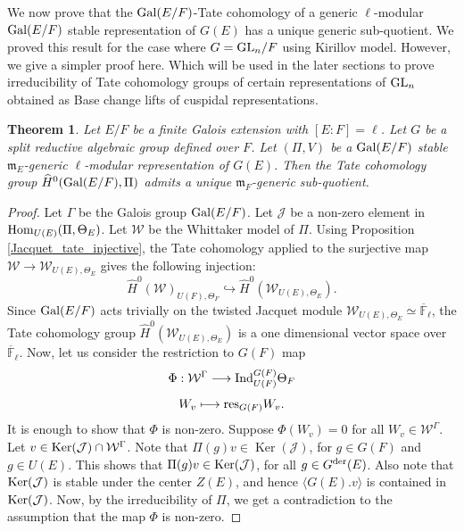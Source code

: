 \documentclass[10pt, reqno]{amsart}
\theoremstyle{plain}
\numberwithin{equation}{section} \newcommand{\di}{\operatorname{dim}}
\newcommand{\Ker}{\operatorname{Ker}}
\newtheorem{theorem}{Theorem}[subsection]
\begin{document}
\subsubsection{}
We now prove that the ${\rm Gal}(E/F)$-Tate cohomology of a generic
$\ell$-modular ${\rm Gal}(E/F)$ stable representation of $G(E)$ has a
unique generic sub-quotient. We proved this result for the case where
$G={\rm GL}_n/F$ using Kirillov model.  However, we give a simpler
proof here. Which will be used in the later sections to prove
irreducibility of Tate cohomology groups of certain representations of
${\rm GL}_n$ obtained as Base change lifts of cuspidal
representations.
\begin{theorem}\label{Tate_generic} 
Let $E/F$ be a finite Galois extension with $[E:F]=\ell$. Let $G$ be
a split reductive algebraic group defined over $F$. Let
$(\Pi,V)$ be a ${\rm Gal}(E/F)$ stable $\mathfrak{m}_E$-generic
$\ell$-modular representation of $G(E)$.  Then the Tate cohomology
group $\widehat{H}^0({\rm Gal}(E/F), \Pi)$ admits a unique
$\mathfrak{m}_F$-generic sub-quotient.
\end{theorem}
\begin{proof}
Let $\Gamma$ be the Galois group ${\rm Gal}(E/F)$.
Let $\mathcal{J}$ be a non-zero element in
${\rm Hom}_{U(E)}(\Pi,\Theta_E)$.  Let $\mathcal{W}$ be the
Whittaker model of $\Pi$. Using Proposition
\ref{Jacquet_tate_injective}, the Tate cohomology applied to the surjective map
$\mathcal{W}\rightarrow \mathcal{W}_{U(E), \Theta_E}$ gives the
following injection:
$$ \widehat{H}^0(\mathcal{W})_{U(F),\Theta_F}
\hookrightarrow \widehat{H}^0(\mathcal{W} _{U(E),\Theta_E}).$$ 
Since $ {\rm Gal}(E/F)$
acts trivially on the twisted Jacquet module
$\mathcal{W}_{U(E),\Theta_E}\simeq \overline{\mathbb{F}}_\ell$, the
Tate cohomology group $\widehat{H}^0(\mathcal{W}_{U(E), \Theta_E})$ is
a one dimensional vector space over $\overline
{\mathbb{F}}_\ell$. Now, let us consider the restriction to $G(F)$ map
$$ \Phi : \mathcal{W}^\Gamma\longrightarrow {\rm Ind}_{U(F)}^{G(F)}\Theta_F$$
$$ W_v \longmapsto {\rm res}_{G(F)}W_v. $$ 
It is enough to show that $\Phi$ is non-zero.  Suppose
$\Phi(W_v) =0$ for all $W_v\in\mathcal{W}^\Gamma$. Let
$v\in {\rm Ker}(\mathcal{J})\cap \mathcal{W}^\Gamma$.  Note that
$\Pi(g)v\in \Ker(\mathcal{J})$, for $g\in G(F)$ and $g\in U(E)$.  This
shows that $\Pi(g)v\in {\rm Ker}(\mathcal{J})$, for all
$g\in G^{\rm der}(E)$. Also note that ${\rm Ker}(\mathcal{J})$ is
stable under the center $Z(E)$, and hence $\langle G(E).v\rangle$ is
contained in ${\rm Ker}(\mathcal{J})$. Now, by the irreducibility of
$\Pi$, we get a contradiction to the assumption that the map $\Phi$ is
non-zero.
\end{proof}
\end{document}

